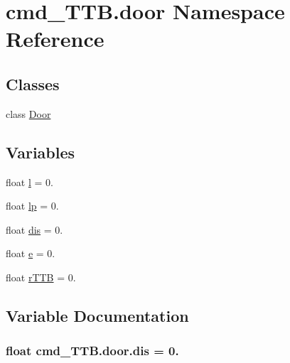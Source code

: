 \hypertarget{namespacecmd__TTB_1_1door}{}\section{cmd\+\_\+\+T\+T\+B.\+door Namespace Reference}
\label{namespacecmd__TTB_1_1door}
\subsection*{Classes}
\begin{DoxyCompactItemize}
\item 
class \hyperlink{classcmd__TTB_1_1door_1_1Door}{Door}
\end{DoxyCompactItemize}
\subsection*{Variables}
\begin{DoxyCompactItemize}
\item 
float \hyperlink{namespacecmd__TTB_1_1door_a464d4de3d59f16b66c790504e49d1fcc}{l} = 0.
\item 
float \hyperlink{namespacecmd__TTB_1_1door_a0de75fefbc56fabb9f68e23314b2451e}{lp} = 0.
\item 
float \hyperlink{namespacecmd__TTB_1_1door_abd3e267603515a4d02dd3b8e210ac96b}{dis} = 0.
\item 
float \hyperlink{namespacecmd__TTB_1_1door_ae04125c3c6ba7fdf00ead2a98493d716}{e} = 0.
\item 
float \hyperlink{namespacecmd__TTB_1_1door_a94ef176d5627a629b784bb8a6fda59df}{r\+T\+TB} = 0.
\end{DoxyCompactItemize}


\subsection{Variable Documentation}
\subsubsection[{\texorpdfstring{dis}{dis}}]{\setlength{\rightskip}{0pt plus 5cm}float cmd\+\_\+\+T\+T\+B.\+door.\+dis = 0.}\hypertarget{namespacecmd__TTB_1_1door_abd3e267603515a4d02dd3b8e210ac96b}{}\label{namespacecmd__TTB_1_1door_abd3e267603515a4d02dd3b8e210ac96b}
